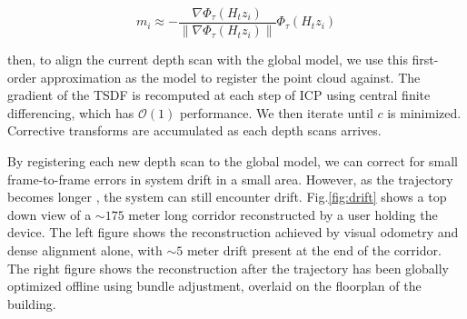 \documentclass[conference]{IEEEtran}
\newcommand{\figref}[1]{Fig.\ref{#1}}
\newcommand{\TSDF}{TSDF\xspace}
\begin{document}
\begin{equation}
 	m_i \approx -\frac{\nabla \Phi_{\tau} (H_t z _i)}{\|\nabla\Phi_{\tau}(H_t
 	z_i)\|} \Phi_{\tau}(H_t z_i)
\end{equation}

\noindent then, to align the current depth scan with the global model, we use
this first-order approximation as the model to register the point cloud against.
The gradient of the \TSDF is recomputed at each step of ICP using central
finite differencing, which has $\mathcal{O}(1)$ performance. We then iterate
until $c$ is minimized. Corrective transforms are accumulated as each depth
scans arrives.

By registering each new depth scan to the global model, we can
correct for small frame-to-frame errors in system drift in a
small area. However, as the trajectory becomes longer , the system can still
encounter drift. \figref{fig:drift} shows a top down view of a $\sim 175$ meter
long  corridor reconstructed by a user holding the device. The left figure
shows the reconstruction achieved by visual odometry and dense alignment alone,
with $\sim 5$ meter drift present at the end of the corridor. The right figure
shows the reconstruction after the trajectory has been globally optimized
offline using bundle adjustment, overlaid on the floorplan of the building.

% 
% 
% 
% 
% 
\end{document}
